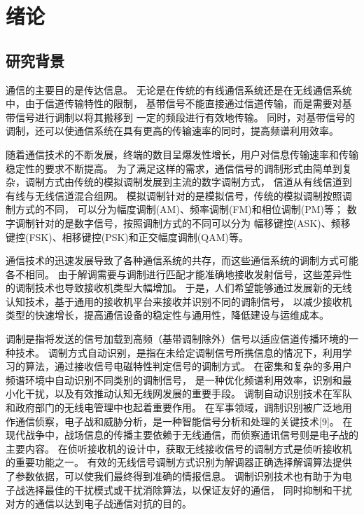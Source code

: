 
\chapter{绪论}
\section{研究背景}

通信的主要目的是传达信息。 
无论是在传统的有线通信系统还是在无线通信系统中，由于信道传输特性的限制，
基带信号不能直接通过信道传输，而是需要对基带信号进行调制以将其搬移到 一定的频段进行有效地传输。 
同时，对基带信号的调制，还可以使通信系统在具有更高的传输速率的同时，提高频谱利用效率。\par

随着通信技术的不断发展，终端的数目呈爆发性增长，用户对信息传输速率和传输稳定性的要求不断提高。
为了满足这样的需求，通信信号的调制形式由简单到复杂，调制方式由传统的模拟调制发展到主流的数字调制方式，
信道从有线信道到有线与无线信道混合组网。
模拟调制针对的是模拟信号，传统的模拟调制按照调制方式的不同，
可以分为幅度调制(AM)、频率调制(FM)和相位调制(PM)等；
数字调制针对的是数字信号，按照调制方式的不同可以分为
幅移键控(ASK)、频移键控(FSK)、相移键控(PSK)和正交幅度调制(QAM)等。 \par

通信技术的迅速发展导致了各种通信系统的共存，而这些通信系统的调制方式可能各不相同。
由于解调需要与调制进行匹配才能准确地接收发射信号，这些差异性的调制技术也导致接收机类型大幅增加。
于是，人们希望能够通过发展新的无线认知技术，基于通用的接收机平台来接收并识别不同的调制信号，
以减少接收机类型的快速增长，提高通信设备的稳定性与通用性，降低建设与运维成本。 \par

调制是指将发送的信号加载到高频（基带调制除外）信号以适应信道传播环境的一种技术。
调制方式自动识别，是指在未给定调制信号所携信息的情况下，利用学习的算法，通过接收信号电磁特性判定信号的调制方式。
在密集和复杂的多用户频谱环境中自动识别不同类别的调制信号，
是一种优化频谱利用效率，识别和最小化干扰，以及有效推动认知无线网发展的重要手段。
调制自动识别技术在军队和政府部门的无线电管理中也起着重要作用。
在军事领域，调制识别被广泛地用作通信侦察，电子战和威胁分析，是一种智能信号分析和处理的关键技术[9]。
在现代战争中，战场信息的传播主要依赖于无线通信，而侦察通讯信号则是电子战的主要内容。
在侦听接收机的设计中，获取无线接收信号的调制方式是侦听接收机的重要功能之一。
有效的无线信号调制方式识别为解调器正确选择解调算法提供了参数依据，可以使我们最终得到准确的情报信息。
调制识别技术也有助于为电子战选择最佳的干扰模式或干扰消除算法，以保证友好的通信，
同时抑制和干扰对方的通信以达到电子战通信对抗的目的。\par

